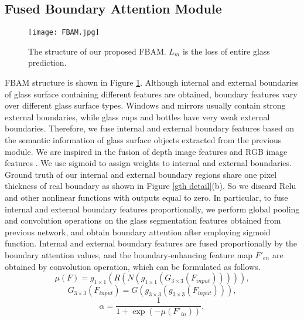 \documentclass[10pt,twocolumn,letterpaper]{article}
\begin{document}
\subsection{Fused Boundary Attention Module}
\begin{figure}[!b]
\vspace*{-3mm}
\centering
\begin{minipage}[t]{1\linewidth}\texttt{[image: FBAM.jpg]}\end{minipage}%
\caption{The structure of our proposed FBAM. ${\textit{L}}_{m}$ is the loss of entire glass prediction. }
\label{fig:4}
\end{figure}
FBAM structure is shown in Figure \ref{fig:4}. Although internal and external boundaries of glass surface containing different features are obtained, boundary features vary over different glass surface types. Windows and mirrors usually contain strong external boundaries, while glass cups and bottles have very weak external boundaries. Therefore, we fuse internal and external boundary features based on the semantic information of glass surface objects extracted from the previous module. We are inspired in the fusion of depth image features and RGB image features \cite{mei2021depth}.
We use sigmoid to assign weights to internal and external boundaries. Ground truth of our internal and external boundary regions share one pixel thickness of real boundary as shown in Figure \ref{gth detail}(b). So we discard Relu and other nonlinear functions with outputs equal to zero. In particular, to fuse internal and external boundary features proportionally, we perform global pooling and convolution operations on the glass segmentation features obtained from previous network, and obtain boundary attention after employing sigmoid function. Internal and external boundary features are fused proportionally by the boundary attention values, and the boundary-enhancing feature map ${\textit{F}}{'}_{en}$ are obtained by convolution operation, which can be formulated as follows.
\begin{equation}
\label{eqn:06}
\mu(\textit{F})={\textit{g}}_{1\times{1}}(\textit{R}({\textit{N}}({\textit{g}}_{1\times{1}}({\textit{G}_{3\times{3}}}(\textit{F}_{input}))))),
\end{equation}
\begin{equation}
\label{eqn:06}
{\textit{G}_{3\times{3}}}(\textit{F}_{input})=G({\textit{g}}_{3\times{3}}({\textit{g}}_{3\times{3}}(\textit{F}_{input}))),
\end{equation}
\begin{equation}
\label{eqn:07}
\alpha=\frac{1}{1+\exp(-\mu({\textit{F}}{'}_{in}))  },
\end{equation}
\end{document}
